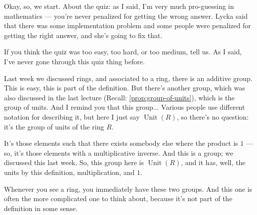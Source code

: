 \begin{speech}[00:00:00 - 00:01:40]
Okay, so, we start. About the quiz: as I said, I'm very much pro-guessing in mathematics --- you're never penalized for getting the wrong answer. Lycka said that there was some implementation problem and some people were penalized for getting the right answer, and she's going to fix that.

If you think the quiz was too easy, too hard, or too medium, tell us. As I said, I've never gone through this quiz thing before.

Last week we discussed rings,  and associated to a ring, there is an additive group.  This is easy, this is part of the definition. But there's another group, which was also discussed in the last lecture (Recall: \cref{prop:group-of-units}), which is the group of units.  And I remind you that this group...  Various people use different notation for describing it, but here I just say $\operatorname{Unit}(R)$, so there's no question: it's the group of units of the ring $R$.

It's those elements such that there exists somebody else where the product is $1$  --- so, it's those elements with a multiplicative inverse. And this is a group; we discussed this last week. So, this group here is $\operatorname{Unit}(R)$, and it has, well, the units by this definition, multiplication, and $1$. 

Whenever you see a ring, you immediately have these two groups. And this one is often the more complicated one to think about, because it's not part of the definition in some sense.
\end{speech}

